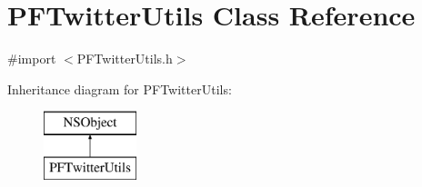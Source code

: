 \hypertarget{interface_p_f_twitter_utils}{}\section{P\+F\+Twitter\+Utils Class Reference}
\label{interface_p_f_twitter_utils}


{\ttfamily \#import $<$P\+F\+Twitter\+Utils.\+h$>$}

Inheritance diagram for P\+F\+Twitter\+Utils\+:\begin{figure}[H]
\begin{center}
\leavevmode
\includegraphics[height=2.000000cm]{interface_p_f_twitter_utils}
\end{center}
\end{figure}
